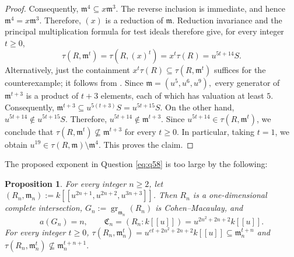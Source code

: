 \documentclass[11pt,a4paper]{amsart}
\numberwithin{equation}{section}
\newtheorem{proposition}[theorem]{Proposition}
\newcommand{\gr}{\operatorname{gr}}
\newcommand{\mm}{\mathfrak m}
\begin{document}
\begin{proof}
 	Consequently,
 	$\mathfrak m^4\subseteq x\mathfrak m^3.$
 	The reverse inclusion is immediate, and hence
 	$\mathfrak m^4=x\mathfrak m^3.$
 	Therefore, $(x)$ is a reduction of $\mathfrak m$.
 	Reduction invariance and the principal multiplication formula
 	for test ideals \cite[Proposition 1.11(1)--(2)]{HY} therefore give,
 	for every integer $t\geq0$,
 	$$
 	\tau(R,\mm^t)=\tau(R,(x)^t)=x^t\tau(R)=u^{5t+14}S.
 	$$
 	Alternatively, just the containment
 	$x^t\tau(R)\subseteq\tau(R,\mm^t)$ suffices for the
 	counterexample; it follows from \cite[Lemma 2.6(1)]{WY}.
 	Since
$\mathfrak m=(u^5,u^6,u^9),$
 	every generator of $\mathfrak m^{t+3}$ is a product of $t+3$ elements, each of which has valuation at least $5$. Consequently,
 	$\mathfrak m^{t+3}
 	\subseteq u^{5(t+3)}S
 	=u^{5t+15}S.$
 	On the other hand,
 $u^{5t+14}\notin u^{5t+15}S.$
 	Therefore,
 $u^{5t+14}\notin\mathfrak m^{t+3}.$
 	Since $u^{5t+14}\in\tau(R,\mathfrak m^t)$, we conclude that
 	$
 	\tau(R,\mathfrak m^t)\not\subseteq\mathfrak m^{t+3}$
  {for every } $t\geq0$.
 	In particular, taking $t=1$, we obtain
$	u^{19}\in\tau(R,\mathfrak m)\setminus\mathfrak m^4.$ This proves the claim.
 \end{proof}
 

 
  	The proposed exponent in Question \ref{eq:q58} is too large by
 the  following:
 
 \begin{proposition}\label{prop:family}
 	For every integer $n\geq2$, let
 	$(R_n,\mm_n):=k[[u^{2n+1},u^{2n+2},u^{3n+3}]]$. Then $R_n$ is a
 	one-dimensional complete intersection, $G_n:=\gr_{\mm_n}(R_n)$
 	is Cohen--Macaulay, and
 	$$
 	a(G_n)=n,\qquad \mathfrak{C}_n=(R_n:k[[u]])=u^{2n^2+2n+2}k[[u]].
 	$$
 	For every integer $t\geq0$,
 	$\tau(R_n,\mm_n^t)=u^{et+2n^2+2n+2}k[[u]]
 	\subseteq\mm_n^{t+n}$ and
$\tau(R_n,\mm_n^t)\not\subseteq\mm_n^{t+n+1}.$

 \end{proposition}
 
\end{document}
